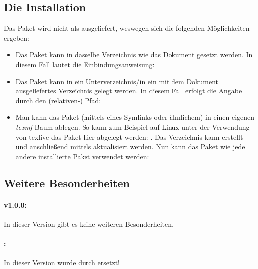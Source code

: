 \documentclass{sopra-base}
\begin{document}
\subsection{Die Installation}
    Das Paket wird nicht als  ausgeliefert, weswegen sich die
    folgenden Möglichkeiten ergeben:
    \begin{itemize}
        \item Das Paket kann in dasselbe Verzeichnis wie das Dokument
                gesetzt werden. In diesem Fall lautet die Einbindungsanweisung:
\begin{plainlatex}
\usepackage{sopra-documentation}
\end{plainlatex}
        \item Das Paket kann in ein Unterverzeichnis/in ein mit
                dem Dokument ausgeliefertes Verzeichnis gelegt werden. In
                diesem Fall erfolgt die Angabe durch den (relativen-) Pfad:
\begin{plainlatex}
\usepackage{./Mein/Pfad/zu/sopra-documentation}
\end{plainlatex}
        \item Man kann das Paket (mittels eines Symlinks oder ähnlichem)
              in einen eigenen \emph{texmf}-Baum ablegen.
              So kann zum Beispiel auf Linux unter der Verwendung von texlive
              das Paket hier abgelegt werden: .
              Das Verzeichnis kann erstellt und anschließend mittels
               aktualisiert werden. Nun kann
              das Paket wie jede andere installierte Paket verwendet werden:
\begin{plainlatex}
\usepackage{sopra-documentation}
\end{plainlatex}
    \end{itemize}
    \subsection{Weitere Besonderheiten}
    \paragraph{v1.0.0:}
    In dieser Version gibt es keine weiteren Besonderheiten.
    \paragraph{\protect\thesodversion:}
    In dieser Version wurde  durch  ersetzt!
\end{document}
